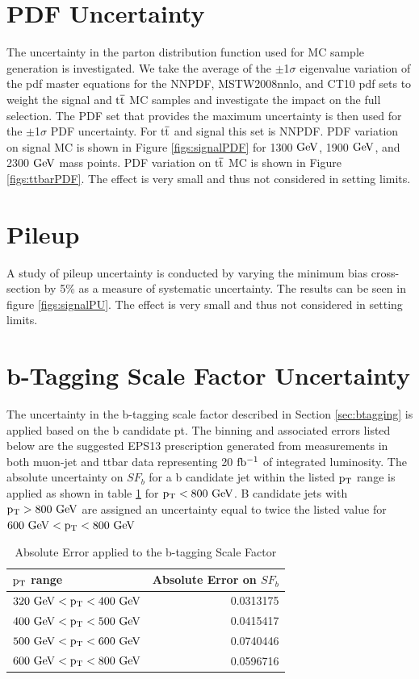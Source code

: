 \section{PDF Uncertainty}
The uncertainty in the parton distribution function used for MC sample generation is investigated.  We take the average of the $\pm$1$\sigma$ eigenvalue 
variation of the pdf master equations \cite{Bourilkov:2006cj} 
for the NNPDF, MSTW2008nnlo, and CT10 pdf sets to weight the signal and $\mathrm{t\overline{t}}$ MC samples and investigate the impact on the full selection.  The PDF set 
that provides the maximum uncertainty is then used for the $\pm$1$\sigma$ PDF uncertainty.  For $\mathrm{t\overline{t}}$ and signal this set is NNPDF. PDF 
variation on signal MC is shown in Figure \ref{figs:signalPDF} for 1300$~\mathrm{GeV}$,
 1900$~\mathrm{GeV}$, and 2300$~\mathrm{GeV}$ mass points.  PDF variation on $\mathrm{t\overline{t}}$ MC is shown in Figure \ref{figs:ttbarPDF}.  The effect is very small and thus not considered in setting limits.

\section{Pileup}
A study of pileup uncertainty is conducted by varying the minimum bias cross-section by 5\% as a measure of systematic uncertainty.  The results 
can be seen in figure \ref{figs:signalPU}.  The effect is very small and thus not considered in setting limits.

\section{b-Tagging Scale Factor Uncertainty}
\label{sec:btagunc}
The uncertainty in the b-tagging scale factor described in Section \ref{sec:btagging} is applied based on the b candidate pt.  The binning and associated errors 
listed below are the suggested EPS13 prescription generated from measurements in both muon-jet and ttbar data representing 20$~\mathrm{fb^{-1}}$ of integrated 
luminosity.  The absolute uncertainty on $SF_b$ for a b candidate jet within the listed $\mathrm{p_{T}}$ range is applied as shown in table \ref{table:btaggingerrors} 
for $\mathrm{p_{T}} < 800~\mathrm{GeV}$.  B candidate jets with $\mathrm{p_{T}} > 800~\mathrm{GeV}$ are assigned an uncertainty equal to twice the listed value for $600~\mathrm{GeV} < \mathrm{p_{T}} < 800~\mathrm{GeV}$

\begin{table}
\begin{center}
\begin{tabular}{|l|r|} 
\hline
\bf{$\mathrm{p_{T}}$ range } & \bf{Absolute Error on $SF_b$} \\
\hline
$320~\mathrm{GeV} < \mathrm{p_{T}} < 400~\mathrm{GeV}$ & 0.0313175 \\
$400~\mathrm{GeV} < \mathrm{p_{T}} < 500~\mathrm{GeV}$ & 0.0415417 \\
$500~\mathrm{GeV} < \mathrm{p_{T}} < 600~\mathrm{GeV}$ & 0.0740446 \\
$600~\mathrm{GeV} < \mathrm{p_{T}} < 800~\mathrm{GeV}$ & 0.0596716 \\
\hline
\end{tabular}
\end{center}
\caption{Absolute Error applied to the b-tagging Scale Factor}
\label{table:btaggingerrors}
\end{table}


